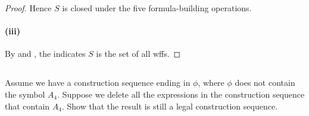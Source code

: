 \documentclass{report}
\begin{document}
\begin{proof}
      Hence $S$ is closed under the five formula-building operations.

    \paragraph{(iii)}%

      By  and , the
         indicates $S$ is the set of all
        wffs.

  \end{proof}

\subsection{}%

  Assume we have a construction sequence ending in $\phi$, where $\phi$ does not
    contain the symbol $A_4$.
  Suppose we delete all the expressions in the construction sequence that
    contain $A_4$.
  Show that the result is still a legal construction sequence.
\end{document}
